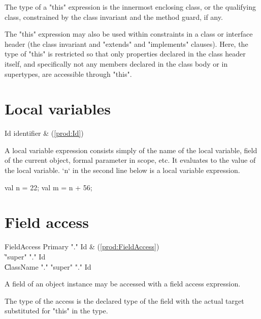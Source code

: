 The type of a \xcd"this" expression is the
innermost enclosing class, or the qualifying class,
constrained by the class invariant and the
method guard, if any.

The \xcd"this" expression may also be used within constraints in
a class or interface header (the class invariant and
\xcd"extends" and \xcd"implements" clauses).  Here, the type of
\xcd"this" is restricted so that only properties declared in the
class header itself, and specifically not any members declared in the class
body or in supertypes, are accessible through \xcd"this".

\section{Local variables}

\begin{bbgrammar}
 Id    \: identifier & (\ref{prod:Id})\\%
\end{bbgrammar}

A local variable expression consists simply of the name of the local variable,
field of the current object, formal parameter in scope, etc. It evaluates to
the value of the local variable. \xcd`n` in the second line below is a local
variable expression. 
\begin{xten}
val n = 22;
val m = n + 56;
\end{xten}



\section{Field access}
\label{FieldAccess}


\begin{bbgrammar}
 FieldAccess    \: Primary \xcd"." Id & (\ref{prod:FieldAccess})\\%
    \| \xcd"super" \xcd"." Id\\
    \| ClassName \xcd"." \xcd"super"  \xcd"." Id
\end{bbgrammar}

A field of an object instance may be  accessed
with a field access expression.

The type of the access is the declared type of the field with the
actual target substituted for \xcd"this" in the type. 


